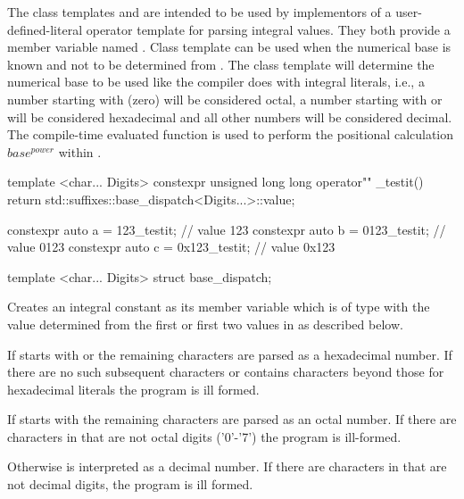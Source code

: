 \documentclass[ebook,11pt,article]{memoir}
\begin{document}
\pnum
The class templates  and  are intended to be used by implementors of a user-defined-literal operator template for parsing integral values. They both provide a  member variable named . 
\pnum
Class template  can be used when the numerical base is known and not to be determined from .
\pnum
The class template  will determine the numerical base to be used like the compiler does with integral literals, i.e., a number starting with  (zero) will be considered octal, a number starting with  or  will be considered hexadecimal and all other numbers will be considered decimal.
\pnum
The compile-time evaluated function  is used to perform the positional calculation $base^{power}$ within .

\enterexample
\begin{codeblock}
template <char... Digits>
constexpr  unsigned long long
operator"" _testit(){
    return std::suffixes::base_dispatch<Digits...>::value;
}

constexpr auto a = 123_testit;   // value 123
constexpr auto b = 0123_testit;  // value 0123
constexpr auto c = 0x123_testit; // value 0x123

\end{codeblock}
\exitexample

\begin{itemdecl}
template <char... Digits>
struct base_dispatch;
\end{itemdecl}

\begin{itemdescr}
\pnum
\effects
Creates an integral constant as its  member variable  which is of type  with the value determined from the first or first two  values in  as described below.

\pnum
If  starts with  or  the remaining characters are parsed as a hexadecimal number. If there are no such subsequent characters or  contains characters beyond those for hexadecimal literals the program is ill formed.

\pnum
If  starts with  the remaining characters are parsed as an octal number. If there are characters in  that are not octal digits ('0'-'7') the program is ill-formed.

\pnum
Otherwise  is interpreted as a decimal number. If there are characters in  that are not decimal digits, the program is ill formed.
\end{itemdescr}
\end{document}
